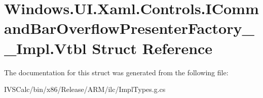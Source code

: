 \hypertarget{struct_windows_1_1_u_i_1_1_xaml_1_1_controls_1_1_i_command_bar_overflow_presenter_factory_____impl_1_1_vtbl}{}\section{Windows.\+U\+I.\+Xaml.\+Controls.\+I\+Command\+Bar\+Overflow\+Presenter\+Factory\+\_\+\+\_\+\+Impl.\+Vtbl Struct Reference}
\label{struct_windows_1_1_u_i_1_1_xaml_1_1_controls_1_1_i_command_bar_overflow_presenter_factory_____impl_1_1_vtbl}


The documentation for this struct was generated from the following file\+:\begin{DoxyCompactItemize}
\item 
I\+V\+S\+Calc/bin/x86/\+Release/\+A\+R\+M/ilc/Impl\+Types.\+g.\+cs\end{DoxyCompactItemize}
